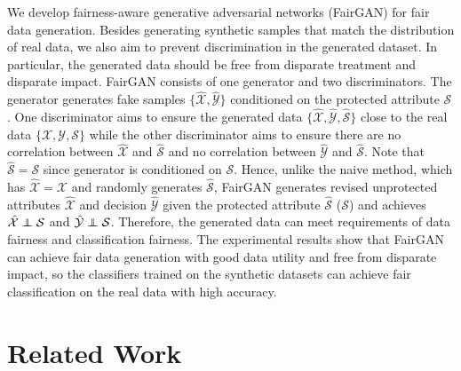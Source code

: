 \documentclass[sigconf]{acmart}
\theoremstyle{definition}
\newcommand\independent{\protect\mathpalette{\protect\independenT}{\perp}}
\def\independenT#1#2{\mathrel{\rlap{$#1#2$}\mkern2mu{#1#2}}}
\begin{document}
We develop fairness-aware generative adversarial networks (FairGAN) for fair data generation. 
Besides generating synthetic samples that match the distribution of real data, we also aim to prevent discrimination in the generated dataset. In particular, the generated data should be free from disparate treatment and disparate impact. FairGAN consists of one generator and two discriminators. The generator generates fake samples $\{\hat{\mathcal{X}}, \hat{\mathcal{Y}}\}$ conditioned on the protected attribute $\mathcal{S}$. One discriminator aims to ensure the generated data $\{\hat{\mathcal{X}}, \hat{\mathcal{Y}}, \hat{\mathcal{S}}\}$ close to the real data $\{\mathcal{X}, \mathcal{Y}, \mathcal{S}\}$ while the other discriminator aims to ensure there are no correlation between $\hat{\mathcal{X}}$ and  $\hat{\mathcal{S}}$ and no correlation between $\hat{\mathcal{Y}}$ and $\hat{\mathcal{S}}$. Note that $\hat{\mathcal{S}} = \mathcal{S}$ since generator is conditioned on $\mathcal{S}$. Hence, unlike the naive method, which has $\hat{\mathcal{X}} = \mathcal{X}$ and randomly generates $ \hat{\mathcal{S}}$, FairGAN generates revised unprotected attributes $\hat{\mathcal{X}}$ and decision $\hat{\mathcal{Y}}$ given the protected attribute $\hat{\mathcal{S}}$ ($\mathcal{S}$) and achieves $\hat{\mathcal{X}} \independent \mathcal{S}$ and $\hat{\mathcal{Y}} \independent \mathcal{S}$. Therefore, the generated data can meet requirements of data fairness and classification fairness. The experimental results show that FairGAN can achieve fair data generation with good data utility and free from disparate impact, so the classifiers trained on the synthetic datasets can achieve fair classification on the real data with high accuracy.


\section{Related Work}
\end{document}
